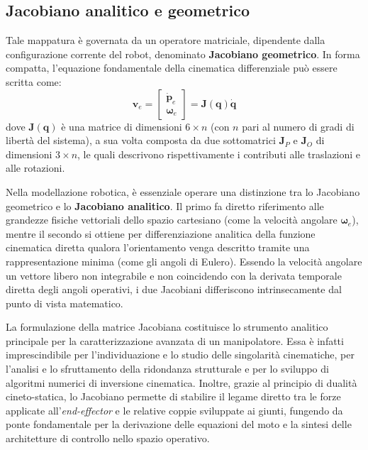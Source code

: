 \subsection{Jacobiano analitico e geometrico}

Tale mappatura è governata da un operatore matriciale, dipendente dalla configurazione corrente del robot, denominato \textbf{Jacobiano geometrico}. 
In forma compatta, l'equazione fondamentale della cinematica differenziale può essere scritta come:
\begin{equation}
    \boldsymbol{v}_e = \begin{bmatrix} \dot{\boldsymbol{p}}_e \\ \boldsymbol{\omega}_e \end{bmatrix} = \boldsymbol{J}(\boldsymbol{q})\dot{\boldsymbol{q}}
\end{equation}
dove $\boldsymbol{J}(\boldsymbol{q})$ è una matrice di dimensioni $6 \times n$ (con $n$ pari al numero di gradi di libertà del sistema), a sua volta composta da due sottomatrici $\boldsymbol{J}_P$ e $\boldsymbol{J}_O$ di dimensioni $3 \times n$, le quali descrivono rispettivamente i contributi alle traslazioni e alle rotazioni.

Nella modellazione robotica, è essenziale operare una distinzione tra lo Jacobiano geometrico e lo \textbf{Jacobiano analitico}. 
Il primo fa diretto riferimento alle grandezze fisiche vettoriali dello spazio cartesiano (come la velocità angolare $\boldsymbol{\omega}_e$), mentre il secondo si ottiene per differenziazione analitica della funzione cinematica diretta qualora l'orientamento venga descritto tramite una rappresentazione minima (come gli angoli di Eulero). 
Essendo la velocità angolare un vettore libero non integrabile e non coincidendo con la derivata temporale diretta degli angoli operativi, i due Jacobiani differiscono intrinsecamente dal punto di vista matematico.

La formulazione della matrice Jacobiana costituisce lo strumento analitico principale per la caratterizzazione avanzata di un manipolatore. 
Essa è infatti imprescindibile per l'individuazione e lo studio delle singolarità cinematiche, per l'analisi e lo sfruttamento della ridondanza strutturale e per lo sviluppo di algoritmi numerici di inversione cinematica.
Inoltre, grazie al principio di dualità cineto-statica, lo Jacobiano permette di stabilire il legame diretto tra le forze applicate all'\textit{end-effector} e le relative coppie sviluppate ai giunti, fungendo da ponte fondamentale per la derivazione delle equazioni del moto e la sintesi delle architetture di controllo nello spazio operativo.

